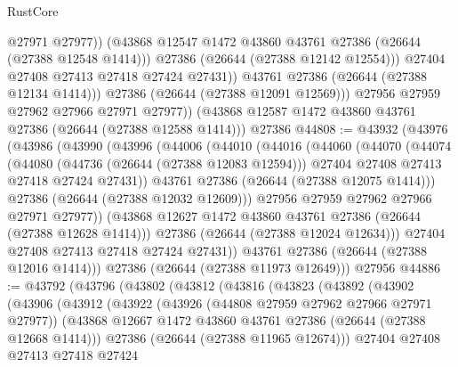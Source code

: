 \begin{lexlean}{RustCore}
\begin{coremodule}
                      @27971
                      @27977))
                  (@43868 @12547 @1472 @43860 @43761 @27386 (@26644 (@27388 @12548 @1414)))
                  @27386
                  (@26644 (@27388 @12142 @12554)))
                @27404
                @27408
                @27413
                @27418
                @27424
                @27431))
            @43761
            @27386
            (@26644 (@27388 @12134 @1414)))
          @27386
          (@26644 (@27388 @12091 @12569)))
        @27956
        @27959
        @27962
        @27966
        @27971
        @27977))
    (@43868 @12587 @1472 @43860 @43761 @27386 (@26644 (@27388 @12588 @1414)))
    @27386
@44808 := @43932
    (@43976
      (@43986
        (@43990
          (@43996
            (@44006
              (@44010
                (@44016
                  (@44060
                    (@44070
                      (@44074
                        (@44080
                          (@44736 (@26644 (@27388 @12083 @12594)))
                          @27404
                          @27408
                          @27413
                          @27418
                          @27424
                          @27431))
                      @43761
                      @27386
                      (@26644 (@27388 @12075 @1414)))
                    @27386
                    (@26644 (@27388 @12032 @12609)))
                  @27956
                  @27959
                  @27962
                  @27966
                  @27971
                  @27977))
              (@43868 @12627 @1472 @43860 @43761 @27386 (@26644 (@27388 @12628 @1414)))
              @27386
              (@26644 (@27388 @12024 @12634)))
            @27404
            @27408
            @27413
            @27418
            @27424
            @27431))
        @43761
        @27386
        (@26644 (@27388 @12016 @1414)))
      @27386
      (@26644 (@27388 @11973 @12649)))
    @27956
@44886 := @43792
    (@43796
      (@43802
        (@43812
          (@43816
            (@43823
              (@43892
                (@43902
                  (@43906
                    (@43912
                      (@43922
                        (@43926 (@44808 @27959 @27962 @27966 @27971 @27977))
                        (@43868 @12667 @1472 @43860 @43761 @27386 (@26644 (@27388 @12668 @1414)))
                        @27386
                        (@26644 (@27388 @11965 @12674)))
                      @27404
                      @27408
                      @27413
                      @27418
                      @27424

\end{coremodule}
\end{lexlean}
